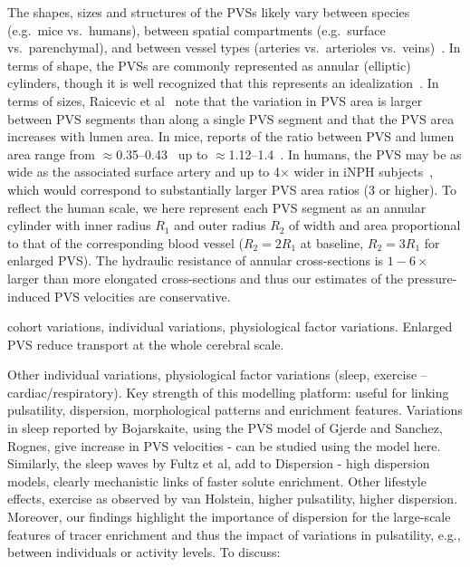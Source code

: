 \documentclass[fleqn,10pt]{wlscirep}
\begin{document}
The shapes, sizes and structures of the PVSs likely vary between
species (e.g.~mice vs.~humans), between spatial compartments
(e.g.~surface vs.~parenchymal), and between vessel types (arteries
vs.~arterioles vs.~veins)~\cite{ichimura1991distribution,
  foley2012realtime, schain2017cortical, mestre2018flow,
  bedussi2018paravascular, raicevic2023sizes, smets2024perivascular,
  vinje2021brain, eide2024functional}. In terms of shape, the PVSs are
commonly represented as annular (elliptic) cylinders, though it is
well recognized that this represents an
idealization~\cite{mestre2018flow, tithof2019hydraulic,
  vinje2021brain, raicevic2023sizes, boster2024hydraulic,
  smets2024perivascular}. In terms of sizes, Raicevic et
al~\cite{raicevic2023sizes} note that the variation in PVS area is
larger between PVS segments than along a single PVS segment and that
the PVS area increases with lumen area. In mice, reports of the ratio
between PVS and lumen area range from
$\approx$0.35--0.43~\cite{smets2024perivascular} up to
$\approx$1.12--1.4~\cite{raicevic2023sizes, mestre2018flow}. In
humans, the PVS may be as wide as the associated surface artery and up
to 4$\times$ wider in iNPH subjects~\cite{eide2024functional}, which
would correspond to substantially larger PVS area ratios (3 or
higher). To reflect the human scale, we here represent each PVS
segment as an annular cylinder with inner radius $R_1$ and outer
radius $R_2$ of width and area proportional to that of the
corresponding blood vessel ($R_2 = 2 R_1$ at baseline, $R_2 = 3 R_1$
for enlarged PVS). The hydraulic resistance of annular cross-sections
is $1-6 \times$~\cite{tithof2019hydraulic} larger than more elongated
cross-sections and thus our estimates of the pressure-induced PVS
velocities are conservative. 

cohort variations, individual variations, physiological factor
variations. Enlarged PVS reduce transport at the whole cerebral scale.

Other individual variations, physiological factor variations (sleep,
exercise -- cardiac/respiratory). Key strength of this modelling
platform: useful for linking pulsatility, dispersion, morphological
patterns and enrichment features. Variations in sleep reported by
Bojarskaite, using the PVS model of Gjerde and Sanchez, Rognes, give
increase in PVS velocities - can be studied using the model
here. Similarly, the sleep waves by Fultz et al, add to Dispersion -
high dispersion models, clearly mechanistic links of faster solute
enrichment. Other lifestyle effects, exercise as observed by van
Holstein, higher pulsatility, higher dispersion. Moreover, our
findings highlight the importance of dispersion for the large-scale
features of tracer enrichment and thus the impact of variations in
pulsatility, e.g., between individuals or activity levels. To discuss:
\cite{hauglund2025norepinephrine}
\end{document}
